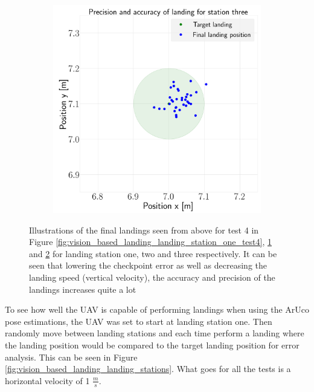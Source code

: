 \documentclass[../Head/report.tex]{subfiles}
\begin{document}
\begin{figure}[H]
\begin{subfigure}[t]{.30\textwidth}
        \caption{}
        \label{fig:vision_based_landing_landing_station_two_test4}
    \end{subfigure}
     \hspace{0.2em}
    \begin{subfigure}[t]{.30\textwidth}
        \centering
        \includegraphics[width=\textwidth]{../Figures/landing_test/test4_speed_0.1_error_0.05/landing_for_station_three.png}
        \caption{}
        \label{fig:vision_based_landing_landing_station_three_test4}
    \end{subfigure}
    \caption{Illustrations of the final landings seen from above for test 4 in Figure \ref{fig:vision_based_landing_landing_station_one_test4}, \ref{fig:vision_based_landing_landing_station_two_test4} and \ref{fig:vision_based_landing_landing_station_three_test4} for landing station one, two and three respectively. It can be seen that lowering the checkpoint error as well as decreasing the landing speed (vertical velocity), the accuracy and precision of the landings increases quite a lot}
    \label{fig:vision_based_landing_test4}
\end{figure}

To see how well the UAV is capable of performing landings when using the ArUco pose estimations, the UAV was set to start at landing station one. Then randomly move between landing stations and each time perform a landing where the landing position would be compared to the target landing position for error analysis. This can be seen in Figure \ref{fig:vision_based_landing_landing_stations}. What goes for all the tests is a horizontal velocity of 1 $\frac{m}{s}$.   
\end{document}

